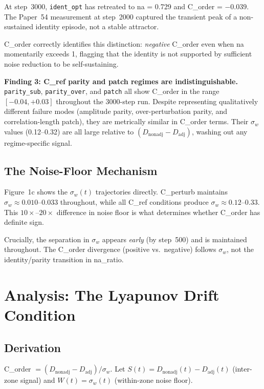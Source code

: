 \documentclass[11pt,a4paper]{article}
\begin{document}
At step~3000, \texttt{ident\_opt} has retreated to na = 0.729 and
C\_order = $-0.039$.
The Paper~54 measurement at step~2000 captured the transient peak of a
non-sustained identity episode, not a stable attractor.

C\_order correctly identifies this distinction: \emph{negative} C\_order
even when na momentarily exceeds 1, flagging that the identity is not
supported by sufficient noise reduction to be self-sustaining.

\textbf{Finding 3: C\_ref parity and patch regimes are indistinguishable.}
\texttt{parity\_sub}, \texttt{parity\_over}, and \texttt{patch} all show
C\_order in the range $[-0.04, +0.03]$ throughout the 3000-step run.
Despite representing qualitatively different failure modes (amplitude
parity, over-perturbation parity, and correlation-length patch), they are
metrically similar in C\_order terms.
Their $\sigma_w$ values (0.12--0.32) are all large relative to
$(D_\mathrm{nonadj} - D_\mathrm{adj})$, washing out any regime-specific signal.

\subsection{The Noise-Floor Mechanism}

Figure~1c shows the $\sigma_w(t)$ trajectories directly.
C\_perturb maintains $\sigma_w \approx 0.010$--$0.033$ throughout, while
all C\_ref conditions produce $\sigma_w \approx 0.12$--$0.33$.
This $10\times$--$20\times$ difference in noise floor is what determines
whether C\_order has definite sign.

Crucially, the separation in $\sigma_w$ appears \emph{early} (by step~500)
and is maintained throughout.
The C\_order divergence (positive vs.\ negative) follows $\sigma_w$, not the
identity/parity transition in na\_ratio.

\section{Analysis: The Lyapunov Drift Condition}

\subsection{Derivation}

C\_order $= (D_\mathrm{nonadj} - D_\mathrm{adj}) / \sigma_w$.
Let $S(t) = D_\mathrm{nonadj}(t) - D_\mathrm{adj}(t)$ (inter-zone signal) and
$W(t) = \sigma_w(t)$ (within-zone noise floor).
\end{document}
